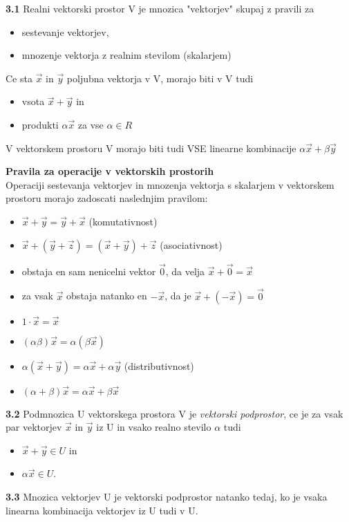 \documentclass{article}
\begin{document}
\begin{multicols}{2}
\textbf{3.1} Realni vektorski prostor V je mnozica "vektorjev" skupaj z pravili za
\begin{itemize}
	\item sestevanje vektorjev,
	\item mnozenje vektorja z realnim stevilom (skalarjem)
\end{itemize}
Ce sta $\vec{x}$ in $\vec{y}$ poljubna vektorja v V, morajo biti v V tudi
\begin{itemize}
	\item vsota $\vec{x} + \vec{y}$ in
	\item produkti $\alpha\vec{x}$ za vse $\alpha \in R$
\end{itemize}
V vektorskem prostoru V morajo biti tudi VSE linearne kombinacije
$\alpha\vec{x} + \beta\vec{y}$

\textbf{Pravila za operacije v vektorskih prostorih}\\
Operaciji sestevanja vektorjev in mnozenja vektorja s skalarjem v vektorskem prostoru
morajo zadoscati naslednjim pravilom:
\begin{itemize}
	\item $\vec{x} + \vec{y} = \vec{y} + \vec{x}$ (komutativnost)
	\item $\vec{x} + (\vec{y} + \vec{z}) = (\vec{x} + \vec{y}) + \vec{z}$ (asociativnost)
	\item obstaja en sam nenicelni vektor $\vec{0}$, da velja $\vec{x} + \vec{0} = \vec{x}$
	\item za vsak $\vec{x}$ obstaja natanko en $-\vec{x}$, da je $\vec{x} + (-\vec{x}) = \vec{0}$
	\item $1 \cdot \vec{x} = \vec{x}$
	\item $(\alpha\beta)\vec{x} = \alpha(\beta\vec{x})$
	\item $\alpha(\vec{x} + \vec{y}) = \alpha\vec{x} + \alpha\vec{y}$ (distributivnost)
	\item $(\alpha + \beta)\vec{x} = \alpha\vec{x} + \beta\vec{x}$
\end{itemize}

\textbf{3.2} Podmnozica U vektorskega prostora V je \textit{vektorski podprostor}, ce je za
vsak par vektorjev $\vec{x}$ in $\vec{y}$ iz U in vsako realno stevilo $\alpha$ tudi
\begin{itemize}
	\item $\vec{x} + \vec{y} \in U$ in
	\item $\alpha\vec{x} \in U$.
\end{itemize}

\textbf{3.3} Mnozica vektorjev U je vektorski podprostor natanko tedaj, ko je vsaka linearna
kombinacija vektorjev iz U tudi v U.


\end{multicols}
\end{document}
